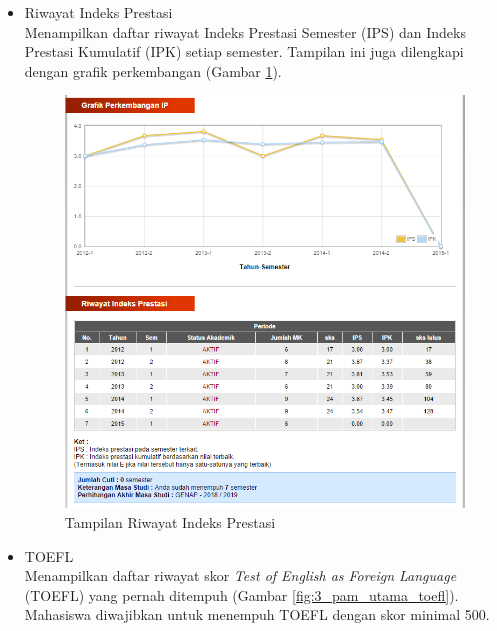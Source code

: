 \begin{enumerate}
\begin{itemize}
\begin{itemize}
			\item Riwayat Indeks Prestasi \\
			Menampilkan daftar riwayat Indeks Prestasi Semester (IPS) dan Indeks Prestasi Kumulatif (IPK) setiap semester. Tampilan ini juga dilengkapi dengan grafik perkembangan (Gambar \ref{fig:3_pam_utama_ip}). 
			\begin{figure}[H]
				\centering
				\includegraphics[scale=0.5]{Gambar/pam-utama-ip}
				\caption{Tampilan Riwayat Indeks Prestasi} 
				\label{fig:3_pam_utama_ip}
			\end{figure}
			
			\item TOEFL \\
			Menampilkan daftar riwayat skor \textit{Test of English as Foreign Language} (TOEFL) yang pernah ditempuh (Gambar \ref{fig:3_pam_utama_toefl}). Mahasiswa diwajibkan untuk menempuh TOEFL dengan skor minimal 500.
			

\end{itemize}
\end{itemize}
\end{enumerate}
